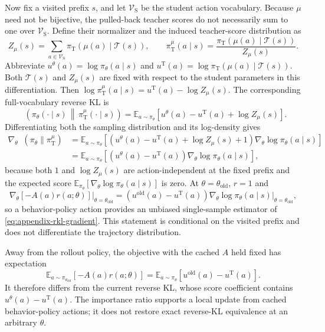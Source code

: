 \documentclass{article}
\theoremstyle{plain}
\theoremstyle{definition}
\theoremstyle{remark}
\newcommand{\E}{\mathbb{E}}
\DeclareMathOperator{\KL}{D_{\mathrm{KL}}}
\begin{document}
Now fix a visited prefix \(s\), and let \(\mathcal V_{\mathrm S}\) be the student action vocabulary. Because \(\mu\) need not be bijective, the pulled-back teacher scores do not necessarily sum to one over \(\mathcal V_{\mathrm S}\). Define their normalizer and the induced teacher-score distribution as
\[
    Z_{\mu}(s)
    =\sum_{a\in\mathcal V_{\mathrm S}}
      \pi_{\mathrm T}(\mu(a)\mid\mathcal T(s)),
    \qquad
    \pi_{\mathrm T}^{\mu}(a\mid s)
    =\frac{\pi_{\mathrm T}(\mu(a)\mid\mathcal T(s))}{Z_{\mu}(s)}.
\]
Abbreviate \(u^\theta(a)=\log\pi_\theta(a\mid s)\) and
\(u^{\mathrm T}(a)=\log\pi_{\mathrm T}(\mu(a)\mid\mathcal T(s))\). Both \(\mathcal T(s)\) and
\(Z_\mu(s)\) are fixed with respect to the student parameters in this differentiation. Then
\(\log \pi_{\mathrm T}^{\mu}(a\mid s)=u^{\mathrm T}(a)-\log Z_\mu(s)\). The corresponding
full-vocabulary reverse KL is
\[
    \KL\!\left(\pi_\theta(\cdot\mid s)\,\middle\|\,\pi_{\mathrm T}^{\mu}(\cdot\mid s)\right)
    =
    \E_{a\sim\pi_\theta}
    \left[u^\theta(a)-u^{\mathrm T}(a)+\log Z_\mu(s)\right].
\]
Differentiating both the sampling distribution and its log-density gives
\begin{align}
    \nabla_\theta\KL(\pi_\theta\|\pi_{\mathrm T}^{\mu})
    &=
    \E_{a\sim\pi_\theta}
    \left[
        \left(u^\theta(a)-u^{\mathrm T}(a)+\log Z_\mu(s)+1\right)
        \nabla_\theta\log\pi_\theta(a\mid s)
    \right] \nonumber\\
    &=
    \E_{a\sim\pi_\theta}
    \left[
        \left(u^\theta(a)-u^{\mathrm T}(a)\right)
        \nabla_\theta\log\pi_\theta(a\mid s)
    \right],
    \label{eq:appendix-rkl-gradient}
\end{align}
because both \(1\) and \(\log Z_\mu(s)\) are action-independent at the fixed prefix and the expected
score \(\E_{\pi_\theta}[\nabla_\theta\log\pi_\theta(a\mid s)]\) is zero.
At \(\theta=\theta_{\mathrm{old}}\), \(r=1\) and
\[
    \left.\nabla_\theta[-A(a)r(a;\theta)]\right|_{\theta=\theta_{\mathrm{old}}}
    =
    \left(u^{\mathrm{old}}(a)-u^{\mathrm T}(a)\right)
    \left.\nabla_\theta\log\pi_\theta(a\mid s)\right|_{\theta=\theta_{\mathrm{old}}},
\]
so a behavior-policy action provides an unbiased single-sample estimator of
\cref{eq:appendix-rkl-gradient}. This statement is conditional on the visited prefix and does not
differentiate the trajectory distribution.

Away from the rollout policy, the objective with the cached \(A\) held fixed has expectation
\[
    \E_{a\sim\pi_{\theta_{\mathrm{old}}}}\!\left[-A(a)r(a;\theta)\right]
    =
    \E_{a\sim\pi_\theta}\!\left[u^{\mathrm{old}}(a)-u^{\mathrm T}(a)\right].
\]
It therefore differs from the current reverse KL, whose score coefficient contains
\(u^\theta(a)-u^{\mathrm T}(a)\). The importance ratio supports a local update from cached
behavior-policy actions; it does not restore exact reverse-KL equivalence at an arbitrary
\(\theta\).
\end{document}
